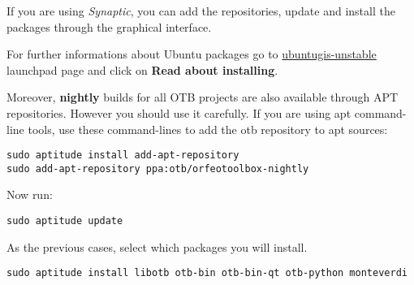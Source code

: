If you are using \emph{Synaptic}, you can add the repositories, update and install the packages through the
graphical interface.

For further informations about Ubuntu packages go to
\href{https://launchpad.net/~ubuntugis/+archive/ubuntugis-unstable}{ubuntugis-unstable}
launchpad page and click on \textbf{Read about installing}.




Moreover, \textbf{nightly} builds for all OTB projects are also available through APT repositories. However you should use it carefully. If you are using apt command-line tools, use these command-lines to add the otb repository to apt sources:

\begin{verbatim}
sudo aptitude install add-apt-repository
sudo add-apt-repository ppa:otb/orfeotoolbox-nightly
\end{verbatim}
Now run:
\begin{verbatim}
sudo aptitude update
\end{verbatim}
As the previous cases, select which packages you will install.
\begin{verbatim}
sudo aptitude install libotb otb-bin otb-bin-qt otb-python monteverdi
\end{verbatim}

